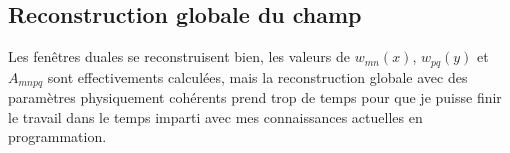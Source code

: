 \subsection{Reconstruction globale du champ}\label{reconstruction}

Les fenêtres duales se reconstruisent bien, les valeurs de $w_{mn}(x)$,
$w_{pq}(y)$ et $A_{mnpq}$ sont effectivements calculées, mais la reconstruction globale avec des paramètres
physiquement cohérents prend trop de temps pour que je puisse finir le travail dans le temps imparti avec mes
connaissances actuelles en programmation.

\newpage
